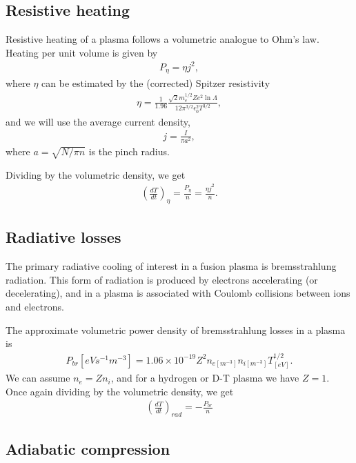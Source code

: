 \documentclass{article}
\begin{document}
\subsection{Resistive heating}
Resistive heating of a plasma follows a volumetric analogue to Ohm's law.
Heating per unit volume is given by
\begin{align*}
    P_{\eta} = \eta j^2,
\end{align*}
where $\eta$ can be estimated by the (corrected) Spitzer resistivity \cite{goldstonIntroductionPlasmaPhysics1995a}
\begin{align*}
    \eta = \frac{1}{1.96} \frac{\sqrt{2} m_e^{1/2} Z e^2 \ln \Lambda}{12 \pi^{3/2} \epsilon_0^2 T^{3/2}},
\end{align*}
and we will use the average current density,
\begin{align*}
j = \frac{I}{\pi a^2},
\end{align*}
where $a = \sqrt{N / \pi n}$ is the pinch radius.

Dividing by the volumetric density, we get
\begin{align*}
    \left( \frac{dT}{dt} \right)_\eta = \frac{P_{\eta}}{n} = \frac{\eta j^2}{n}.
\end{align*}

\subsection{Radiative losses}
The primary radiative cooling of interest in a fusion plasma is bremsstrahlung radiation.
This form of radiation is produced by electrons accelerating (or decelerating), and in a
plasma is associated with Coulomb collisions between ions and electrons.

The approximate volumetric power density of bremsstrahlung losses in a plasma is \cite{goldstonIntroductionPlasmaPhysics1995a}
\begin{align*}
    P_{br}[\unit{eV s^{-1} m^{-3}}] = 1.06 \times 10^{-19} Z^2 n_{e[\unit{m^{-3}}]} n_{i[\unit{m^{-3}}]} T_{[\unit{eV}]}^{1/2}.
\end{align*}
We can assume $n_e = Z n_i$, and for a hydrogen or D-T plasma we have $Z = 1$.
Once again dividing by the volumetric density, we get
\begin{align*}
    \left( \frac{dT}{dt} \right)_{rad} = -\frac{P_{br}}{n}
\end{align*}

\subsection{Adiabatic compression}
\end{document}
